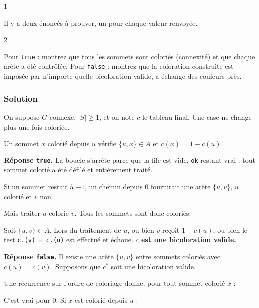 \documentclass[11pt,a4paper]{article}
\newcommand{\equationajustee}[1]{%
  \sbox{\boiteequation}{$\displaystyle #1$}%
  \ifdim\wd\boiteequation>\linewidth
    \[\resizebox{\linewidth}{!}{\usebox{\boiteequation}}\]%
  \else
    \[#1\]%
  \fi}
\begin{document}
\begin{indication}{1}

Il y a deux énoncés à prouver, un pour chaque valeur renvoyée.

\end{indication}

\begin{indication}{2}

Pour \texttt{true} : montrez que tous les sommets sont coloriés (connexité) et que chaque arête a été contrôlée. Pour \texttt{false} : montrez que la coloration construite est imposée par n'importe quelle bicoloration valide, à échange des couleurs près.

\end{indication}

\hypertarget{solution-24}{%
\subsubsection{Solution}\label{solution-24}}

On suppose \(G\) connexe, \(|S| \ge 1\), et on note \(c\) le tableau final. Une case ne change plus une fois coloriée.

Un sommet \(x\) colorié depuis \(u\) vérifie \(\{u, x\} \in A\) et \(c(x) = 1 - c(u)\).

\textbf{Réponse \texttt{true}.} La boucle s'arrête parce que la file est vide, \texttt{ok} restant vrai : tout sommet colorié a été défilé et entièrement traité.

Si un sommet restait à \(-1\), un chemin depuis \(0\) fournirait une arête \(\{u, v\}\), \(u\) colorié et \(v\) non.

Mais traiter \(u\) colorie \(v\). Tous les sommets sont donc coloriés.

Soit \(\{u, v\} \in A\). Lors du traitement de \(u\), ou bien \(v\) reçoit \(1 - c(u)\), ou bien le test \texttt{c.(v)\ =\ c.(u)} est effectué et échoue. \textbf{\(c\) est une bicoloration valide.}

\textbf{Réponse \texttt{false}.} Il existe une arête \(\{u, v\}\) entre sommets coloriés avec \(c(u) = c(v)\). Supposons que \(c^*\) soit une bicoloration valide.

Une récurrence sur l'ordre de coloriage donne, pour tout sommet colorié \(x\) :

\equationajustee{c(x) \equiv c^*(x) + c^*(0) \pmod 2.}

C'est vrai pour \(0\). Si \(x\) est colorié depuis \(u\) :

\equationajustee{\begin{aligned}
c(x) &\equiv c(u) + 1 \\
&\equiv c^*(u) + 1 + c^*(0) \\
&\equiv c^*(x) + c^*(0) \pmod 2.
\end{aligned}}
\end{document}
